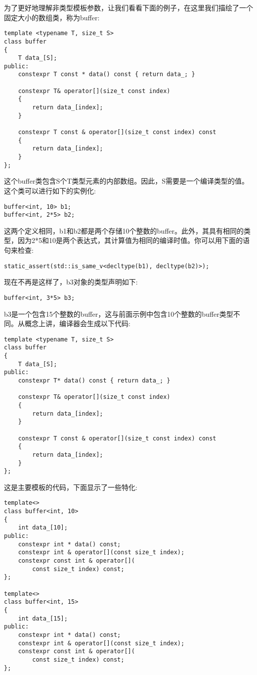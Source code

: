 为了更好地理解非类型模板参数，让我们看看下面的例子，在这里我们描绘了一个固定大小的数组类，称为buffer:

\begin{lstlisting}[style=styleCXX]
template <typename T, size_t S>
class buffer
{
	T data_[S];
public:
	constexpr T const * data() const { return data_; }
	
	constexpr T& operator[](size_t const index)
	{
		return data_[index];
	}

	constexpr T const & operator[](size_t const index) const
	{
		return data_[index];
	}
};
\end{lstlisting}

这个buffer类包含S个T类型元素的内部数组。因此，S需要是一个编译类型的值。这个类可以进行如下的实例化:

\begin{lstlisting}[style=styleCXX]
buffer<int, 10> b1;
buffer<int, 2*5> b2;
\end{lstlisting}

这两个定义相同，b1和b2都是两个存储10个整数的buffer。此外，其具有相同的类型，因为2*5和10是两个表达式，其计算值为相同的编译时值。你可以用下面的语句来检查:

\begin{lstlisting}[style=styleCXX]
static_assert(std::is_same_v<decltype(b1), decltype(b2)>);
\end{lstlisting}

现在不再是这样了，b3对象的类型声明如下:

\begin{lstlisting}[style=styleCXX]
buffer<int, 3*5> b3;
\end{lstlisting}

b3是一个包含15个整数的buffer，这与前面示例中包含10个整数的buffer类型不同。从概念上讲，编译器会生成以下代码:

\begin{lstlisting}[style=styleCXX]
template <typename T, size_t S>
class buffer
{
	T data_[S];
public:
	constexpr T* data() const { return data_; }
	
	constexpr T& operator[](size_t const index)
	{
		return data_[index];
	}

	constexpr T const & operator[](size_t const index) const
	{
		return data_[index];
	}
};
\end{lstlisting}

这是主要模板的代码，下面显示了一些特化:

\begin{lstlisting}[style=styleCXX]
template<>
class buffer<int, 10>
{
	int data_[10];
public:
	constexpr int * data() const;
	constexpr int & operator[](const size_t index);
	constexpr const int & operator[](
		const size_t index) const;
};

template<>
class buffer<int, 15>
{
	int data_[15];
public:
	constexpr int * data() const;
	constexpr int & operator[](const size_t index);
	constexpr const int & operator[](
		const size_t index) const;
};
\end{lstlisting}

